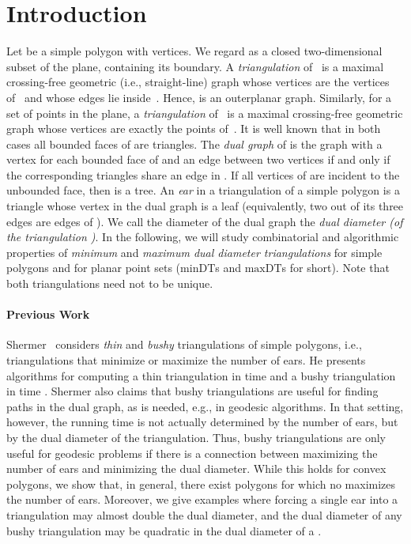 \documentclass{article}
\newcommand{\MinDT}{\ensuremath{\mathrm{minDT}}}
\newcommand{\MaxDT}{\ensuremath{\mathrm{maxDT}}}
\begin{document}
\section{Introduction}
Let  be a simple polygon with  vertices. 
We regard  as a closed two-dimensional subset of the plane, 
containing its boundary. A \emph{triangulation}  of~ is a 
maximal crossing-free geometric (i.e., straight-line) graph whose 
vertices are the vertices of~ and whose edges lie inside~. 
Hence,  is an outerplanar graph. Similarly, for a set  of 
 points in the plane, a \emph{triangulation}  of~ is a maximal 
crossing-free geometric graph whose vertices are exactly the points of~.
It is well known that in both cases all bounded faces of  are triangles.
The \emph{dual graph}  of  is the graph 
with a vertex for each bounded face of  and an edge between 
two vertices if and only if the corresponding triangles share an edge in 
. If all vertices of  are incident to the unbounded face,
then  is a tree. An \emph{ear} in a 
triangulation of a simple polygon is a triangle whose vertex in the dual graph is a leaf (equivalently, two out of its three edges are edges of ).
We call the diameter of the dual graph  the \emph{dual diameter 
(of the triangulation )}.
In the following, we will study combinatorial and algorithmic properties
of
\emph{minimum} and \emph{maximum dual diameter triangulations} 
for simple polygons and for planar point sets
(\MinDT{}s and \MaxDT{}s for short).
Note that both triangulations need not to be unique.

\paragraph{Previous Work}
Shermer~\cite{s-cbtt-91} considers \emph{thin} and \emph{bushy} 
triangulations of simple polygons, i.e., triangulations that minimize or 
maximize the number of ears.
He presents algorithms for computing a thin triangulation in time
 and a bushy triangulation in time .
Shermer also claims that bushy triangulations are useful for finding paths 
in the dual graph, as is needed, e.g., in geodesic algorithms.
In that setting, however, the running time is not actually determined 
by the number of ears, but by the dual diameter of the triangulation.
Thus, bushy triangulations are only useful for geodesic problems if 
there is a connection between maximizing the number of ears and minimizing
the dual diameter.
While this holds for convex polygons, we show that, in general, there 
exist polygons for which no  maximizes the number of ears.
Moreover, we give examples where forcing a single ear into a 
triangulation may almost double the dual diameter, and the dual diameter 
of any bushy triangulation may be quadratic in the dual diameter of a 
.
\end{document}
